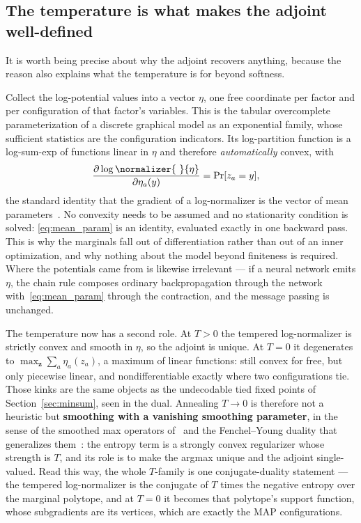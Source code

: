 \subsection{The temperature is what makes the adjoint well-defined}
\label{sec:smoothing}

It is worth being precise about why the adjoint recovers anything, because the reason also explains what the temperature is for beyond softness.

Collect the log-potential values into a vector $\eta$, one free coordinate per factor and per configuration of that factor's variables. This is the tabular overcomplete parameterization of a discrete graphical model as an exponential family, whose sufficient statistics are the configuration indicators. Its log-partition function is a log-sum-exp of functions linear in $\eta$ and therefore \emph{automatically} convex, with
\begin{align}
    \label{eq:mean_param}
    \frac{\partial \log \normalizer{\ }{\eta}}{\partial \eta_a(y)} &= \Pr[z_a = y],
\end{align}
the standard identity that the gradient of a log-normalizer is the vector of mean parameters~\citep{WainwrightJordan2008}. No convexity needs to be assumed and no stationarity condition is solved: \eqref{eq:mean_param} is an identity, evaluated exactly in one backward pass. This is why the marginals fall out of differentiation rather than out of an inner optimization, and why nothing about the model beyond finiteness is required. Where the potentials came from is likewise irrelevant --- if a neural network emits $\eta$, the chain rule composes ordinary backpropagation through the network with~\eqref{eq:mean_param} through the contraction, and the message passing is unchanged.

The temperature now has a second role. At $T > 0$ the tempered log-normalizer is strictly convex and smooth in $\eta$, so the adjoint is unique. At $T = 0$ it degenerates to $\max_{\mathbf{z}} \sum_a \eta_a(z_a)$, a maximum of linear functions: still convex for free, but only piecewise linear, and nondifferentiable exactly where two configurations tie. Those kinks are the same objects as the undecodable tied fixed points of Section~\ref{sec:minsum}, seen in the dual. Annealing $T \rightarrow 0$ is therefore not a heuristic but \textbf{smoothing with a vanishing smoothing parameter}, in the sense of the smoothed max operators of~\citet{Mensch2018} and the Fenchel--Young duality that generalizes them~\citep{Blondel2020}: the entropy term is a strongly convex regularizer whose strength is $T$, and its role is to make the argmax unique and the adjoint single-valued. Read this way, the whole $T$-family is one conjugate-duality statement --- the tempered log-normalizer is the conjugate of $T$ times the negative entropy over the marginal polytope, and at $T = 0$ it becomes that polytope's support function, whose subgradients are its vertices, which are exactly the MAP configurations.

